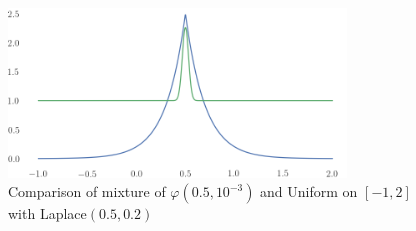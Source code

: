 \begin{figure}
\center
    \includegraphics[width=0.8\textwidth]{./TeX_files/laplaceVSgauss_uniform.png}
    \caption{Comparison of mixture of $\varphi(0.5, 10^{-3})$ and Uniform on $[-1,2]$ with Laplace$(0.5, 0.2)$ }
    \label{fig:laplaceVSgauss_uniform}
\end{figure}
